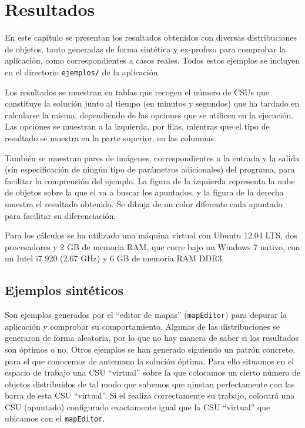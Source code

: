 %
%
%
%

\chapter{Resultados} \label{chap:resultados}
En este capítulo se presentan los resultados obtenidos con diversas
distribuciones de objetos, tanto generadas de forma sintética y ex-profeso para
comprobar la aplicación, como correspondientes a casos reales. Todos estos
ejemplos se incluyen en el directorio \texttt{ejemplos/} de la aplicación.

Los resultados se muestran en tablas que recogen el número de CSUs que
constituye la solución junto al tiempo (en minutos y segundos) que ha tardado en calcularse la misma,
dependiendo de las opciones que se utilicen en la ejecución. Las opciones se
muestran a la izquierda, por filas, mientras que el tipo de resultado se muestra
en la parte superior, en las columnas.

También se muestran pares de imágenes, correspondientes a la entrada y la salida
(sin especificación de ningún tipo de parámetros adicionales) del programa, para
facilitar la comprensión del ejemplo. La figura de la izquierda representa la
nube de objetos sobre la que el \CSUO{} va a buscar los apuntados, y la
figura de la derecha muestra el resultado obtenido. Se dibuja de un color
diferente cada apuntado para facilitar su diferenciación.

Para los cálculos se ha utilizado una máquina virtual con Ubuntu 12.04 LTS, dos
procesadores y 2 GB de memoria RAM, que corre bajo un Windows 7 nativo, con un
Intel i7 920 (2.67 GHz) y 6 GB de memoria RAM DDR3.

\section{Ejemplos sintéticos} \label{sec:sintetico}
Son ejemplos generados por el ``editor de mapas'' (\texttt{mapEditor}) para depurar la aplicación y
comprobar su comportamiento. Algunas de las distribuciones se generaron de forma
aleatoria, por lo que no hay manera de saber si los resultados son óptimos o
no. Otros ejemplos se han generado siguiendo un patrón concreto, para el que
conocemos de antemano la solución óptima. Para ello situamos en el espacio de
trabajo una CSU ``virtual'' sobre la que colocamos un cierto número de objetos
distribuidos de tal modo que sabemos que ajustan perfectamente con las barra de
esta CSU ``virtual''.
Si el \CSUO{} realiza correctamente su trabajo, colocará una CSU (apuntado) configurado
exactamente igual que la CSU ``virtual'' que ubicamos con el \texttt{mapEditor}.

